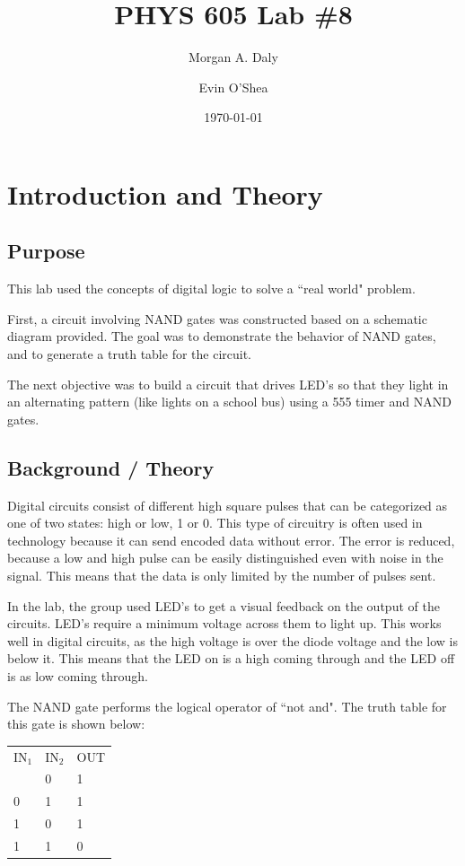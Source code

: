 \documentclass[twocolumn, amsmath]{revtex4}
\begin{document}
\title{PHYS 605 Lab \#8} 

\author{Morgan A. Daly}
\author{Evin O'Shea}
\date{\today} 


\maketitle


\section{Introduction and Theory}
\subsection{Purpose}

This lab used the concepts of digital logic to solve a ``real world" problem.

First, a circuit involving NAND gates was constructed based on a schematic diagram provided. The goal was to demonstrate the behavior of NAND gates, and to generate a truth table for the circuit.

The next objective was to build a circuit that drives LED's so that they light in an alternating pattern (like lights on a school bus) using a 555 timer and NAND gates.


\subsection{Background / Theory}

Digital circuits consist of different high square pulses that can be categorized as one of two states: high or low, 1 or 0. This type of circuitry is often used in technology because it can send encoded data without error. The error is reduced, because a low and high pulse can be easily distinguished even with noise in the signal. This means that the data is only limited by the number of pulses sent.

In the lab, the group used LED's to get a visual feedback on the output of the circuits. 
LED's require a minimum voltage across them to light up. This works well in digital circuits, as the high voltage is over the diode voltage and the low is below it. This means that the LED on is a high coming through and the LED off is as low coming through.

The NAND gate performs the logical operator of ``not and". The truth table for this gate is shown below:

\begin{center}
	\begin{ruledtabular}
    \begin{tabular}{ l l l}
	IN$_1$ & IN$_2$ & OUT\\ \colrule
	0 & 0 & 1 \\
	0 & 1 & 1 \\
	1 & 0 & 1 \\
	1 & 1 & 0  \\
\end{tabular}
    \end{ruledtabular}
\end{center}
\end{document}
